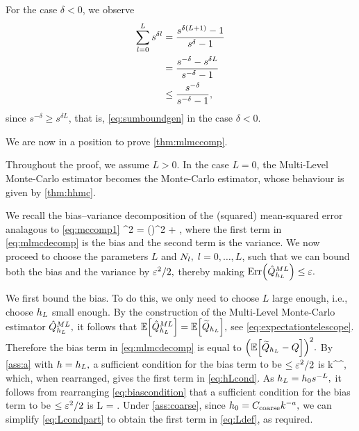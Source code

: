 For the case $\delta < 0$, we observe
\begin{align*}
\sum_{l=0}^L s^{\delta l} &= \frac{s^{\delta\mleft(L+1\mright)} -1}{s^{\delta}-1}\nonumber\\
&= \frac{s^{-\delta} - s^{\delta L}}{s^{-\delta}-1}\nonumber\\
&\leq \frac{s^{-\delta}}{s^{-\delta}-1},%
\end{align*}
since $s^{-\delta} \geq  s^{\delta L}$, that is, \cref{eq:sumboundgen} in the case $\delta < 0.$
\epf

We are now in a position to prove \cref{thm:mlmccomp}.

\label{page:mlmccompproof}
Throughout the proof, we assume $L>0.$ In the case $L=0$, the Multi-Level Monte-Carlo estimator becomes the Monte-Carlo estimator, whose behaviour is given by \cref{thm:hhmc}.

We recall the bias--variance decomposition of the (squared) mean-squared error analagous to \cref{eq:mccomp1}
\beq\label{eq:mlmcdecomp}
\errQhatMLhL^2 = \mleft(\mright)^2 + \VAR{\QhatMLhL},
\eeq
where the first term in \cref{eq:mlmcdecomp} is the bias and the second term is the variance.
We now proceed to choose the parameters $L$ and $N_{l},$ $l = 0,\ldots,L$, such that we can bound both the bias and the variance by $\varepsilon^2/2,$ thereby making $\err{\QhatMLhL} \leq \eps.$

We first bound the bias. To do this, we only need to choose $L$ large enough, i.e., choose $h_{L}$ small enough. By the construction of the Multi-Level Monte-Carlo estimator $\hat{Q}^{ML}_{h_{L}},$ it follows that $\EXP{\QhatMLhL} = \EXP{\QhLtilde},$ see \cref{eq:expectationtelescope}. Therefore the bias term in \cref{eq:mlmcdecomp} is equal to $\mleft(\EXP{\QhLtilde - Q}\mright)^2.$ By \cref{ass:a} with $h=h_{L},$ a sufficient condition for the bias term to be $\leq \varepsilon^2/2$ is
\beq\label{eq:biascondition}
\co k^\sigma \hL^\alpha \leq {},
\eeq
which, when rearranged, gives the first term in \eqref{eq:hLcond}. As $h_{L} = h_{0} s^{-L},$ it follows from rearranging \cref{eq:biascondition} that a sufficient condition for the bias term to be $\leq \varepsilon^2/2$ is
\beq\label{eq:Lcondpart}
L = .
\eeq
Under \cref{ass:coarse}, since $h_{0} = C_{\mathrm{coarse}} k^{-a},$ we can simplify \eqref{eq:Lcondpart} to obtain the first term in \eqref{eq:Ldef}, as required.


